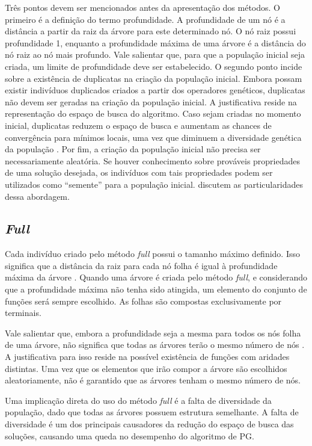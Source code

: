 Três pontos devem ser mencionados antes da apresentação dos métodos. O primeiro é a definição do termo profundidade. A profundidade de um nó é a distância a partir da raiz da árvore para este determinado nó. O nó raiz possui profundidade 1, enquanto a profundidade máxima de uma árvore é a distância do nó raiz ao nó mais profundo. Vale salientar que, para que a população inicial seja criada, um limite de profundidade deve ser estabelecido. O segundo ponto incide sobre a existência de duplicatas na criação da população inicial. Embora possam existir indivíduos duplicados criados a partir dos operadores genéticos, duplicatas não devem ser geradas na criação da população inicial. A justificativa reside na representação do espaço de busca do algoritmo. Caso sejam criadas no momento inicial, duplicatas reduzem o espaço de busca e aumentam as chances de convergência para mínimos locais, uma vez que diminuem a diversidade genética da população \cite{koza1992}. %
Por fim, a criação da população inicial não precisa ser necessariamente aleatória. Se houver conhecimento sobre prováveis propriedades de uma solução desejada, os indivíduos com tais propriedades podem ser utilizados como ``semente'' para a população inicial.  discutem as particularidades dessa abordagem.

\subsection{\textit{Full}}
Cada indivíduo criado pelo método \textit{full} possui o tamanho máximo definido. Isso significa que a distância da raiz para cada nó folha é igual à profundidade máxima da árvore \cite{koza1992}. Quando uma árvore é criada pelo método \textit{full}, e considerando que a profundidade máxima não tenha sido atingida, um elemento do conjunto de funções será sempre escolhido. As folhas são compostas exclusivamente por terminais.

Vale salientar que, embora a profundidade seja a mesma para todos os nós folha de uma árvore, não significa que todas as árvores terão o mesmo número de nós \cite{poli2008}. A justificativa para isso reside na possível existência de funções com aridades distintas. Uma vez que os elementos que irão compor a árvore são escolhidos aleatoriamente, não é garantido que as árvores tenham o mesmo número de nós.

Uma implicação direta do uso do método \textit{full} é a falta de diversidade da população, dado que todas as árvores possuem estrutura semelhante. A falta de diversidade é um dos principais causadores da redução do espaço de busca das soluções, causando uma queda no desempenho do algoritmo de PG.

